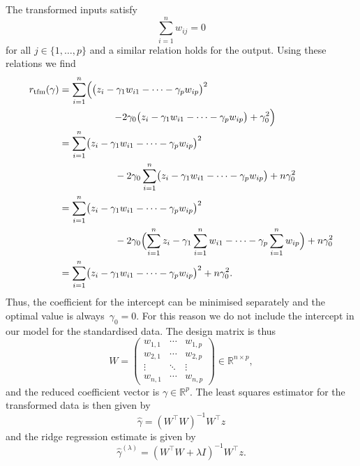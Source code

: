\documentclass[
  a4paper,
]{article}
\theoremstyle{definition}
\theoremstyle{definition}
\theoremstyle{definition}
\theoremstyle{definition}
\theoremstyle{remark}
\begin{document}
The transformed inputs satisfy
\begin{equation*}
  \sum_{i=1}^n w_{ij} = 0
\end{equation*}
for all \(j\in\{1, \ldots, p\}\) and a similar relation holds for the output.
Using these relations we find
\begin{align*}
  r_\mathrm{tfm}(\gamma)
  &= \sum_{i=1}^n \Bigl(
      \bigl( z_i - \gamma_1 w_{i1} - \cdots - \gamma_p w_{ip} \bigr)^2 \Bigr. \\
    &\hskip2cm \Bigl.
      - 2 \gamma_0 \bigl( z_i - \gamma_1 w_{i1} - \cdots - \gamma_p w_{ip} \bigr)
      + \gamma_0^2
    \Bigr) \\
  &= \sum_{i=1}^n
      \bigl( z_i - \gamma_1 w_{i1} - \cdots - \gamma_p w_{ip} \bigr)^2 \\
    &\hskip2cm
      - 2 \gamma_0 \sum_{i=1}^n \bigl( z_i - \gamma_1 w_{i1} - \cdots - \gamma_p w_{ip} \bigr)
      + n \gamma_0^2 \\
  &= \sum_{i=1}^n
      \bigl( z_i - \gamma_1 w_{i1} - \cdots - \gamma_p w_{ip} \bigr)^2 \\
    &\hskip2cm
      - 2 \gamma_0 \Bigl( \sum_{i=1}^n z_i - \gamma_1 \sum_{i=1}^n w_{i1} - \cdots - \gamma_p \sum_{i=1}^n w_{ip} \Bigr)
      + n \gamma_0^2 \\
  &= \sum_{i=1}^n
      \bigl( z_i - \gamma_1 w_{i1} - \cdots - \gamma_p w_{ip} \bigr)^2
      + n \gamma_0^2.
\end{align*}
Thus, the coefficient for the intercept can be minimised separately and
the optimal value is always~\(\gamma_0 = 0\). For this reason we do
not include the intercept in our model for the standardised data.
The design matrix is thus
\begin{equation*}
  W
  = \begin{pmatrix}
    w_{1,1} & \cdots & w_{1,p} \\
    w_{2,1} & \cdots & w_{2,p} \\
    \vdots & \ddots & \vdots \\
    w_{n,1} & \cdots & w_{n,p}
  \end{pmatrix} \in \mathbb{R}^{n\times p},
\end{equation*}
and the reduced coefficient vector is \(\gamma \in \mathbb{R}^p\).
The least squares estimator for the transformed data is then given by
\begin{equation*}
  \hat\gamma
  = (W^\top W)^{-1} W^\top z
\end{equation*}
and the ridge regression estimate is given by
\begin{equation*}
  \hat\gamma^{(\lambda)}
  = (W^\top W + \lambda I)^{-1} W^\top z.
\end{equation*}
\end{document}
